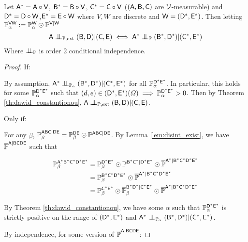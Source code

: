 \begin{theorem}
Let $\mathsf{A}^*=\mathsf{A}\circ \mathsf{V}$, $\mathsf{B}^*=\mathsf{B}\circ\mathsf{V}$, $\mathsf{C}^*=\mathsf{C}\circ \mathsf{V}$ ($(\mathsf{A},\mathsf{B},\mathsf{C})$ are $\mathcal{V}$-measurable) and $\mathsf{D}^*=\mathsf{D}\circ \mathsf{W}$,$\mathsf{E}^*=\mathsf{E}\circ \mathsf{W}$ where $V,W$ are discrete and $\mathsf{W}=(\mathsf{D}^*,\mathsf{E}^*)$. Then letting $\mathbb{P}_\alpha^{\mathsf{VW}}:=\mathbb{P}_\alpha^{\mathsf{W}}\odot \mathbb{P}^{\mathsf{V}|\mathsf{W}}$
\begin{align}
	\RV{A}\CI_{\prob{P},\text{ext}}(\RV{B},\RV{D})|(\RV{C},\RV{E})\iff \RV{A}^*\CI_{\prob{P}}(\RV{B}^*,\RV{D}^*)|(\RV{C}^*,\RV{E}^*)
\end{align}
Where $\CI_{\prob{P}}$ is order 2 conditional independence.
\end{theorem}

\begin{proof}
If:

By assumption, $\RV{A}^*\CI_{\prob{P}_\alpha}(\RV{B}^*,\RV{D}^*)|(\RV{C}^*,\RV{E}^*)$ for all $\mathbb{P}_\alpha^{\mathsf{D^*E^*}}$. In particular, this holds for some $\mathbb{P}_\alpha^{\mathsf{D^*E^*}}$ such that $(d,e)\in (\mathsf{D}^*,\mathsf{E}^*)(\Omega)\implies \mathbb{P}_\alpha^{\mathsf{D^*E^*}} >0$. Then by Theorem \ref{th:dawid_constantionou}, $\RV{A}\CI_{\prob{P},\text{ext}}(\RV{B},\RV{D})|(\RV{C},\RV{E})$.

Only if:

For any $\beta$, $\mathbb{P}_\beta^{\mathsf{ABC}|\mathsf{DE}}= \mathbb{P}_\beta^{\mathsf{DE}}\odot \mathbb{P}^{\mathsf{ABC}|\mathsf{DE}}$. By Lemma \ref{lem:disint_exist}, we have $\overline{\mathbb{P}}^{\mathsf{A}|\mathsf{BCDE}}$ such that

\begin{align}
	\mathbb{P}_\beta^{\mathsf{A^*B^*C^*}\mathsf{D^*E^*}} &= \mathbb{P}_\beta^{\mathsf{D^*E^*}}\odot \mathbb{P}^{\mathsf{B^*C^*}|\mathsf{D^*E^*}}\odot \overline{\mathbb{P}}^{\mathsf{A^*}|\mathsf{B^*C^*D^*E^*}}\\
									  &= \mathbb{P}_\beta^{\mathsf{B^*C^*D^*E^*}}\odot \overline{\mathbb{P}}^{\mathsf{A^*}|\mathsf{B^*C^*D^*E^*}}\\
									  &= \mathbb{P}_\beta^{\mathsf{C^*E^*}}\odot \overline{\mathbb{P}}_\beta^{\mathsf{B^*D^*}|\mathsf{C^*E^*}}\odot \overline{\mathbb{P}}^{\mathsf{A}^*|\mathsf{B^*C^*D^*E^*}}
\end{align}

By Theorem \ref{th:dawid_constantionou}, we have some $\alpha$ such that $\mathbb{P}_\alpha^{\mathsf{D^*E^*}}$ is strictly positive on the range of $(\mathsf{D}^*,\mathsf{E}^*)$ and $\RV{A}^*\CI_{\prob{P}_\alpha}(\RV{B}^*,\RV{D}^*)|(\RV{C}^*,\RV{E}^*)$.

By independence, for some version of $\overline{\mathbb{P}}^{\mathsf{A}|\mathsf{BCDE}}$:


\end{proof}
